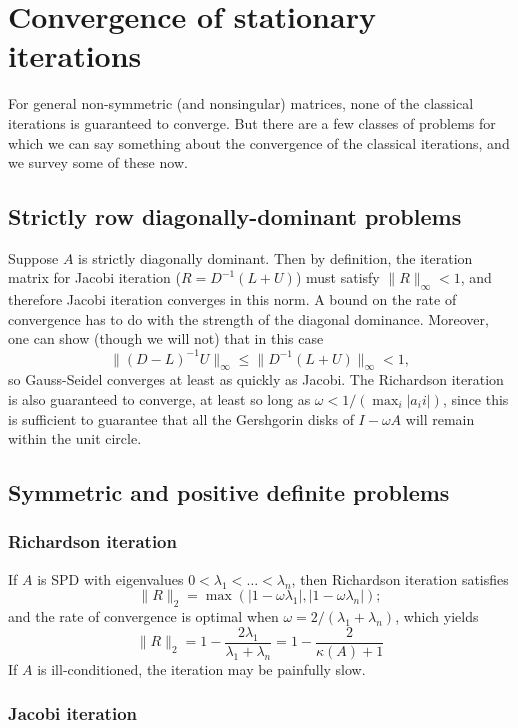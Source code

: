 \section{Convergence of stationary iterations}

For general non-symmetric (and nonsingular) matrices, none of
the classical iterations is guaranteed to converge.
But there are a few classes of problems for which we can say something
about the convergence of the classical iterations, and we survey some
of these now.

\subsection{Strictly row diagonally-dominant problems}

Suppose $A$ is strictly diagonally dominant.  Then by definition,
the iteration matrix for Jacobi iteration ($R = D^{-1} (L+U)$)
must satisfy $\|R\|_\infty < 1$, and therefore Jacobi iteration
converges in this norm.  A bound on the rate of convergence has
to do with the strength of the diagonal dominance.  Moreover,
one can show (though we will not) that in this case
\[
  \|(D-L)^{-1} U\|_\infty \leq \|D^{-1}(L+U)\|_\infty < 1,
\]
so Gauss-Seidel converges at least as quickly as Jacobi.  The
Richardson iteration is also guaranteed to converge, at least so
long as $\omega < 1/(\max_i |a_ii|)$, since this is sufficient to
guarantee that all the Gershgorin disks of $I-\omega A$ will
remain within the unit circle.

\subsection{Symmetric and positive definite problems}

\subsubsection{Richardson iteration}

If $A$ is SPD with eigenvalues
$0 < \lambda_1 < \ldots < \lambda_n$, then Richardson
iteration satisfies
\[
  \|R\|_2 = \max(|1-\omega \lambda_1|, |1-\omega \lambda_n|);
\]
and the rate of convergence is optimal when
$\omega = 2/(\lambda_1 + \lambda_n)$,
which yields
\[
  \|R\|_2
    = 1 - \frac{2 \lambda_1}{\lambda_1 + \lambda_n}
    = 1 - \frac{2}{\kappa(A) + 1}
\]
If $A$ is ill-conditioned, the iteration may be painfully slow.

\subsubsection{Jacobi iteration}

